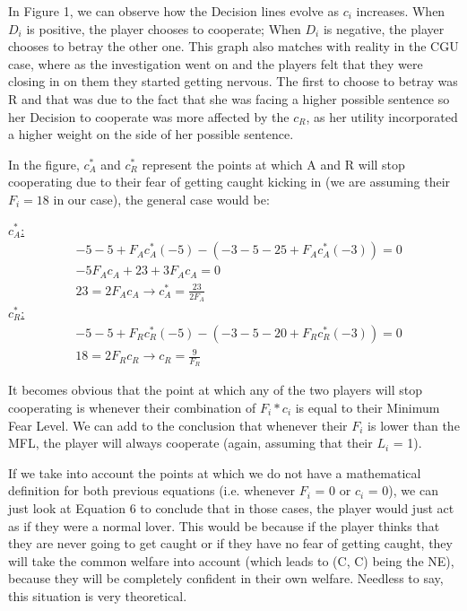 \documentclass[11pt, a4paper]{article}
\begin{document}
In Figure 1, we can observe how the Decision lines evolve as $c_i$ increases. When $D_i$ is positive, the player chooses to cooperate; When $D_i$ is negative, the player chooses to betray the other one. This graph also matches with reality in the CGU case, where as the investigation went on and the players felt that they were closing in on them they started getting nervous. The first to choose to betray was R and that was due to the fact that she was facing a higher possible sentence so her Decision to cooperate was more affected by the $c_R$, as her utility incorporated a higher weight on the
side of her possible sentence.

In the figure, $c_A^*$ and $c_R^*$ represent the points at which A and R will stop cooperating due to their fear of getting caught kicking in (we are assuming their $F_i = 18$ in our case), the general case would be:

\underline{$c_A^*$:}
$$
\begin{aligned}
& -5-5+F_A c_A^*(-5)-\left(-3-5-25+F_A c_A^*(-3)\right)=0 \\
& -5 F_A c_A+23+3 F_A c_A=0 \\
& 23=2 F_A c_A \rightarrow c_A^*=\frac{23}{2 F_A}
\end{aligned}
$$
\underline{$c_R^*$:}
$$
\begin{aligned}
  & -5-5+F_R c_R^*(-5)-\left(-3-5-20+F_R c_R^*(-3)\right)=0 \\ &  18=2 F_R c_R \rightarrow c_R=\frac{9}{F_R}  
\end{aligned}
$$

It becomes obvious that the point at which any of the two players will stop cooperating is whenever their combination of $F_i*c_i$ is equal to their Minimum Fear Level. We can add to the conclusion that whenever their $F_i$ is lower than the MFL, the player will always
cooperate (again, assuming that their $L_i$ = 1).


If we take into account the points at which we do not have a mathematical definition for both previous equations (i.e. whenever $F_i$ = 0 or $c_i$ = 0), we can just look at Equation 6 to conclude that in those cases, the player would just act as if they were a normal lover. This would be because if the player thinks that they are never going to get caught or if they have no fear of getting caught, they will take the common welfare into account (which leads to (C, C) being the NE), because they will be completely confident in their own welfare.
Needless to say, this situation is very theoretical.
\end{document}
